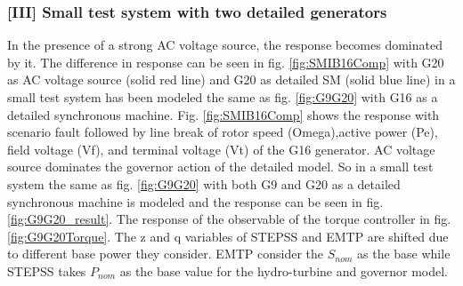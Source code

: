 \documentclass{report}
\begin{document}
\subsubsection{[III] Small test system with two detailed generators}
In the presence of a strong AC voltage source, the response becomes dominated by it. The difference in response can be seen in fig. \ref{fig:SMIB16Comp} with G20 as AC voltage source (solid red line) and G20 as detailed SM (solid blue line) in a small test system has been modeled the same as fig. \ref{fig:G9G20} with G16 as a detailed synchronous machine. Fig. \ref{fig:SMIB16Comp} shows the response with scenario fault followed by line break of rotor speed (Omega),active power (Pe), field voltage (Vf), and terminal voltage (Vt) of the G16 generator. AC voltage source dominates the governor action of the detailed model. So in a small test system the same as fig. \ref{fig:G9G20} with both G9 and G20 as a detailed synchronous machine is modeled and the response can be seen in fig. \ref{fig:G9G20_result}. The response of the observable of the torque controller in fig. \ref{fig:G9G20Torque}. The z and q variables of STEPSS and EMTP are shifted due to different base power they consider. EMTP consider the $S_{nom}$ as the base while STEPSS takes $P_{nom}$ as the base value for the hydro-turbine and governor model. 
\begin{figure}[htbp]
  \centering
  \hfill
  \end{figure}
\end{document}
